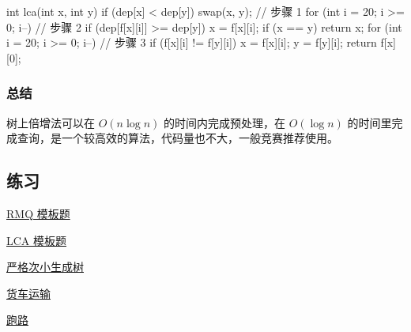 \begin{cppcode}
int lca(int x, int y) {
  if (dep[x] < dep[y]) swap(x, y);  // 步骤 1
  for (int i = 20; i >= 0; i--)     // 步骤 2
  {
    if (dep[f[x][i]] >= dep[y]) x = f[x][i];
    if (x == y) return x;
  }
  for (int i = 20; i >= 0; i--)  // 步骤 3
    if (f[x][i] != f[y][i]) {
      x = f[x][i];
      y = f[y][i];
    }
  return f[x][0];
}
\end{cppcode}

\subsubsection{总结}

树上倍增法可以在 $O(n\log n)$ 的时间内完成预处理，在 $O(\log n)$ 的时间里完成查询，是一个较高效的算法，代码量也不大，一般竞赛推荐使用。

\subsection{练习}

\href{https://www.luogu.org/problemnew/show/P3865}{RMQ 模板题}

\href{https://www.luogu.org/problemnew/show/P3379}{LCA 模板题}

\href{https://www.luogu.org/problemnew/show/P4180}{严格次小生成树}

\href{https://www.luogu.org/problemnew/show/P1967}{货车运输}

\href{https://www.luogu.org/problemnew/show/P1613}{跑路}
